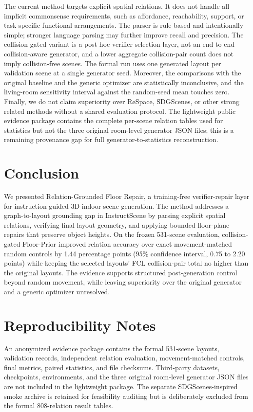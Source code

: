 \documentclass{egpubl}
\newcommand{\method}{Relation-Grounded Floor Repair}
\newcommand{\fp}{Floor-Prior}
\begin{document}
The current method targets explicit spatial relations. It does not handle all implicit commonsense requirements, such as affordance, reachability, support, or task-specific functional arrangements. The parser is rule-based and intentionally simple; stronger language parsing may further improve recall and precision. The collision-gated variant is a post-hoc verifier-selection layer, not an end-to-end collision-aware generator, and a lower aggregate collision-pair count does not imply collision-free scenes. The formal run uses one generated layout per validation scene at a single generator seed. Moreover, the comparisons with the original baseline and the generic optimizer are statistically inconclusive, and the living-room sensitivity interval against the random-seed mean touches zero. Finally, we do not claim superiority over ReSpace, SDGScenes, or other strong related methods without a shared evaluation protocol. The lightweight public evidence package contains the complete per-scene relation tables used for statistics but not the three original room-level generator JSON files; this is a remaining provenance gap for full generator-to-statistics reconstruction.

\section{Conclusion}

We presented \method, a training-free verifier-repair layer for instruction-guided 3D indoor scene generation. The method addresses a graph-to-layout grounding gap in InstructScene by parsing explicit spatial relations, verifying final layout geometry, and applying bounded floor-plane repairs that preserve object heights. On the frozen 531-scene evaluation, collision-gated \fp{} improved relation accuracy over exact movement-matched random controls by 1.44 percentage points (95\% confidence interval, 0.75 to 2.20 points) while keeping the selected layouts' FCL collision-pair total no higher than the original layouts. The evidence supports structured post-generation control beyond random movement, while leaving superiority over the original generator and a generic optimizer unresolved.

\section*{Reproducibility Notes}

An anonymized evidence package contains the formal 531-scene layouts, validation records, independent relation evaluation, movement-matched controls, final metrics, paired statistics, and file checksums. Third-party datasets, checkpoints, environments, and the three original room-level generator JSON files are not included in the lightweight package. The separate SDGScenes-inspired smoke archive is retained for feasibility auditing but is deliberately excluded from the formal 808-relation result tables.



\end{document}

